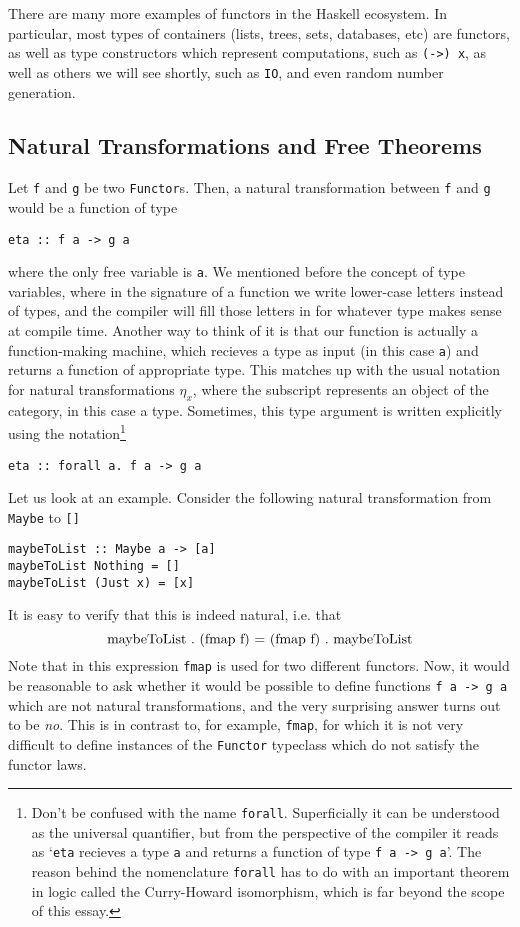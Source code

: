 \documentclass[11pt]{article}
\theoremstyle{nonumberplain}
\newcommand*\lsin{\lstinline}
\newcommand*\lsmath[1]{\text{\lstinline|#1|}}
\begin{document}
There are many more examples of functors in the Haskell ecosystem. In particular, most types of containers (lists, trees, sets, databases, etc) are functors, as well as type constructors which represent computations, such as \lsin|(->) x|, as well as others we will see shortly, such as \lsin|IO|, and even random number generation.

\subsection{Natural Transformations and Free Theorems}

Let \lsin|f| and \lsin|g| be two \lsin|Functor|s. Then, a natural transformation between \lsin|f| and \lsin|g| would be a function of type
\begin{lstlisting}
eta :: f a -> g a
\end{lstlisting}
where the only free variable is \lsin|a|. We mentioned before the concept of type variables, where in the signature of a function we write lower-case letters instead of types, and the compiler will fill those letters in for whatever type makes sense at compile time. Another way to think of it is that our function is actually a function-making machine, which recieves a type as input (in this case \lsin|a|) and returns a function of appropriate type. This matches up with the usual notation for natural transformations $\eta_x$, where the subscript represents an object of the category, in this case a type. Sometimes, this type argument is written explicitly using the notation\footnote{Don't be confused with the name \lsin|forall|. Superficially it can be understood as the universal quantifier, but from the perspective of the compiler it reads as `\lsin|eta| recieves a type \lsin|a| and returns a function of type \lsin|f a -> g a|'. The reason behind the nomenclature \lsin|forall| has to do with an important theorem in logic called the Curry-Howard isomorphism, which is far beyond the scope of this essay.}
\begin{lstlisting}
eta :: forall a. f a -> g a
\end{lstlisting}

Let us look at an example. Consider the following natural transformation from \lsin|Maybe| to \lsin|[]|
\begin{lstlisting}
maybeToList :: Maybe a -> [a]
maybeToList Nothing = []
maybeToList (Just x) = [x]
\end{lstlisting}

It is easy to verify that this is indeed natural, i.e. that
\begin{equation}
\lsmath{maybeToList . (fmap f) = (fmap f) . maybeToList}
\end{equation}
Note that in this expression \lsin|fmap| is used for two different functors. Now, it would be reasonable to ask whether it would be possible to define functions \lsin|f a -> g a| which are not natural transformations, and the very surprising answer turns out to be \emph{no}. This is in contrast to, for example, \lsin|fmap|, for which it is not very difficult to define instances of the \lsin|Functor| typeclass which do not satisfy the functor laws.
\end{document}
